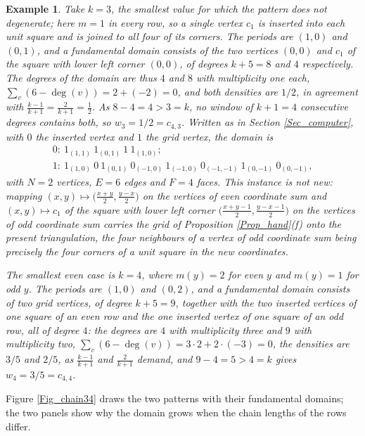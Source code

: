 \documentclass[12pt,a4paper]{article}%
\newtheorem{example}[theorem]{Example}
\begin{document}
\begin{example}
\label{Ex_chain3}Take $k=3$, the smallest value for which the pattern does not degenerate; here $m=1$
in every row, so a single vertex $c_{1}$ is inserted into each unit square and is joined to all four
of its corners. The periods are $(1,0)$ and $(0,1)$, and a fundamental domain consists of the two
vertices $(0,0)$ and $c_{1}$ of the square with lower left corner $(0,0)$, of degrees $k+5=8$ and $4$
respectively. The degrees of the domain are thus $4$ and $8$ with multiplicity one each,
$\sum_{v}(6-\deg (v))=2+(-2)=0$, and both densities are $1/2$, in agreement with
$\frac{k-1}{k+1}=\frac{2}{k+1}=\frac{1}{2}$. As $8-4=4>3=k$, no window of $k+1=4$ consecutive degrees
contains both, so $w_{3}=1/2=c_{4,3}$. Written as in Section \ref{Sec_computer}, with $0$ the
inserted vertex and $1$ the grid vertex, the domain is
\[
\begin{array}{l}
0:\ 1_{(1,1)}\ 1_{(0,1)}\ 1\ 1_{(1,0)};\\
1:\ 1_{(1,0)}\ 0\ 1_{(0,1)}\ 0_{(-1,0)}\ 1_{(-1,0)}\ 0_{(-1,-1)}\ 1_{(0,-1)}\ 0_{(0,-1)},
\end{array}
\]
with $N=2$ vertices, $E=6$ edges and $F=4$ faces. This instance is not new: mapping
$(x,y)\mapsto \bigl( \tfrac{x+y}{2},\tfrac{y-x}{2}\bigr) $ on the vertices of even coordinate sum and
$(x,y)\mapsto c_{1}$ of the square with lower left corner
$\bigl( \tfrac{x+y-1}{2},\tfrac{y-x-1}{2}\bigr) $ on the vertices of odd coordinate sum carries the
grid of Proposition \ref{Prop_hand}(f) onto the present triangulation, the four neighbours of a
vertex of odd coordinate sum being precisely the four corners of a unit square in the new coordinates.

The smallest even case is $k=4$, where $m(y)=2$ for even $y$ and $m(y)=1$ for odd $y$. The periods
are $(1,0)$ and $(0,2)$, and a fundamental domain consists of two grid vertices, of degree
$k+5=9$, together with the two inserted vertices of one square of an even row and the one inserted
vertex of one square of an odd row, all of degree $4$: the degrees are $4$ with multiplicity three and
$9$ with multiplicity two, $\sum_{v}(6-\deg (v))=3\cdot 2+2\cdot (-3)=0$, the densities are $3/5$ and
$2/5$, as $\frac{k-1}{k+1}$ and $\frac{2}{k+1}$ demand, and $9-4=5>4=k$ gives $w_{4}=3/5=c_{4,4}$.
\end{example}

Figure \ref{Fig_chain34} draws the two patterns with their fundamental domains; the
two panels show why the domain grows when the chain lengths of the rows differ.
\end{document}
